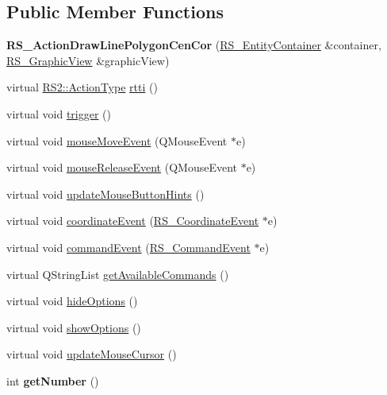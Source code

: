 \subsection*{Public Member Functions}
\begin{DoxyCompactItemize}
\item 
\hypertarget{classRS__ActionDrawLinePolygonCenCor_adc0eea734f27993bab39441e950561c0}{{\bfseries R\-S\-\_\-\-Action\-Draw\-Line\-Polygon\-Cen\-Cor} (\hyperlink{classRS__EntityContainer}{R\-S\-\_\-\-Entity\-Container} \&container, \hyperlink{classRS__GraphicView}{R\-S\-\_\-\-Graphic\-View} \&graphic\-View)}\label{classRS__ActionDrawLinePolygonCenCor_adc0eea734f27993bab39441e950561c0}

\item 
virtual \hyperlink{classRS2_afe3523e0bc41fd637b892321cfc4b9d7}{R\-S2\-::\-Action\-Type} \hyperlink{classRS__ActionDrawLinePolygonCenCor_a541c2066d2868e4cbce51fcb62a26b5b}{rtti} ()
\item 
virtual void \hyperlink{classRS__ActionDrawLinePolygonCenCor_a77658504f3efbb34221bcfbf45bbaad5}{trigger} ()
\item 
virtual void \hyperlink{classRS__ActionDrawLinePolygonCenCor_addf32aa261021b7095b388d655817ed4}{mouse\-Move\-Event} (Q\-Mouse\-Event $\ast$e)
\item 
virtual void \hyperlink{classRS__ActionDrawLinePolygonCenCor_a37629aaec7f261376838dc4df1e5e889}{mouse\-Release\-Event} (Q\-Mouse\-Event $\ast$e)
\item 
virtual void \hyperlink{classRS__ActionDrawLinePolygonCenCor_a24e8284c8db78f8219169eb8c97c6822}{update\-Mouse\-Button\-Hints} ()
\item 
virtual void \hyperlink{classRS__ActionDrawLinePolygonCenCor_a5c23004d6ec0259bc5522680dc8e7d3e}{coordinate\-Event} (\hyperlink{classRS__CoordinateEvent}{R\-S\-\_\-\-Coordinate\-Event} $\ast$e)
\item 
virtual void \hyperlink{classRS__ActionDrawLinePolygonCenCor_a8f6037b775736ee6eb3133af4471b8b2}{command\-Event} (\hyperlink{classRS__CommandEvent}{R\-S\-\_\-\-Command\-Event} $\ast$e)
\item 
virtual Q\-String\-List \hyperlink{classRS__ActionDrawLinePolygonCenCor_aaf9562690d7e9f3a830299309dcffa71}{get\-Available\-Commands} ()
\item 
virtual void \hyperlink{classRS__ActionDrawLinePolygonCenCor_a2c183ff33ac4d22df1c28dc0e84014e7}{hide\-Options} ()
\item 
virtual void \hyperlink{classRS__ActionDrawLinePolygonCenCor_a5a69b3de9501647372e02bf9ac425d0d}{show\-Options} ()
\item 
virtual void \hyperlink{classRS__ActionDrawLinePolygonCenCor_ac3173624161935d0369f47cfa91b6a3b}{update\-Mouse\-Cursor} ()
\item 
\hypertarget{classRS__ActionDrawLinePolygonCenCor_a6fcbfa33a3ac660e855e3f27a638ef16}{int {\bfseries get\-Number} ()}\label{classRS__ActionDrawLinePolygonCenCor_a6fcbfa33a3ac660e855e3f27a638ef16}


\end{DoxyCompactItemize}

